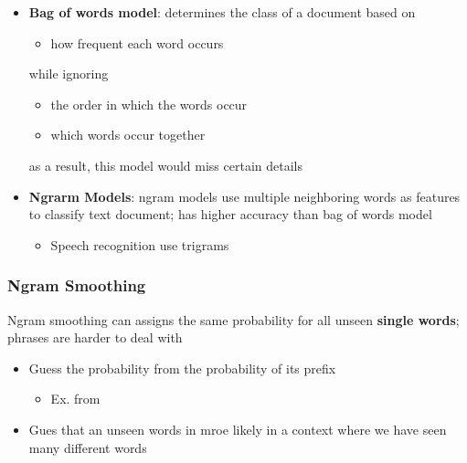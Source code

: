     \begin{itemize}
      \item \textbf{Bag of words model}: determines the class of a document
      based on
      \begin{itemize}
        \item how frequent each word occurs
      \end{itemize}
      while ignoring
      \begin{itemize}
        \item the order in which the words occur
        \item which words occur together
      \end{itemize}
      as a result, this model would miss certain details

      \item \textbf{Ngrarm Models}: ngram models use multiple neighboring words
      as features to classify text document; has higher accuracy than bag
      of words model
      \begin{itemize}
        \item Speech recognition use trigrams
      \end{itemize}
    \end{itemize}

    \subsubsection{Ngram Smoothing}

      Ngram smoothing can assigns the same probability for all unseen
      \textbf{single words}; phrases are harder to deal with

      \begin{itemize}
        \item Guess the probability from the probability of its prefix
        \begin{itemize}
          \item Ex.  from 
        \end{itemize}

        \item Gues that an unseen words in mroe likely in a context
        where we have seen many different words
      \end{itemize}